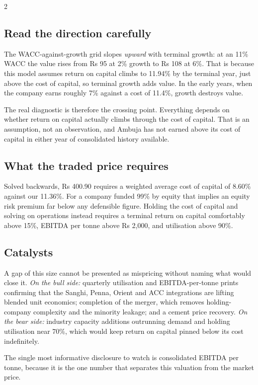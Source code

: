 \begin{paracol}{2}
\subsection{Read the direction carefully}

The WACC-against-growth grid slopes \emph{upward} with terminal growth: at an 11\%
WACC the value rises from Rs 95 at 2\% growth to Rs 108 at 6\%. That is because this
model assumes return on capital climbs to 11.94\% by the terminal year, just above
the cost of capital, so terminal growth adds value. In the early years, when the
company earns roughly 7\% against a cost of 11.4\%, growth destroys value.

The real diagnostic is therefore the crossing point. Everything depends on whether
return on capital actually climbs through the cost of capital. That is an assumption,
not an observation, and Ambuja has not earned above its cost of capital in either
year of consolidated history available.

\subsection{What the traded price requires}

Solved backwards, Rs 400.90 requires a weighted average cost of capital of 8.60\%
against our 11.36\%. For a company funded 99\% by equity that implies an equity risk
premium far below any defensible figure. Holding the cost of capital and solving on
operations instead requires a terminal return on capital comfortably above 15\%,
EBITDA per tonne above Rs 2,000, and utilisation above 90\%.

\subsection{Catalysts}

A gap of this size cannot be presented as mispricing without naming what would close
it. \emph{On the bull side:} quarterly utilisation and EBITDA-per-tonne prints
confirming that the Sanghi, Penna, Orient and ACC integrations are lifting blended
unit economics; completion of the merger, which removes holding-company complexity
and the minority leakage; and a cement price recovery. \emph{On the bear side:}
industry capacity additions outrunning demand and holding utilisation near 70\%,
which would keep return on capital pinned below its cost indefinitely.

The single most informative disclosure to watch is consolidated EBITDA per tonne,
because it is the one number that separates this valuation from the market price.


\end{paracol}
